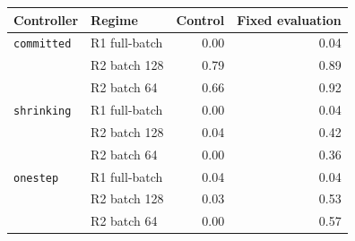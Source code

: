 \begin{tabular}{llrr}
\toprule
Controller & Regime & Control & Fixed evaluation \\
\midrule
\texttt{committed} & R1 full-batch & 0.00 & 0.04 \\
 & R2 batch 128 & 0.79 & 0.89 \\
 & R2 batch 64 & 0.66 & 0.92 \\
\midrule
\texttt{shrinking} & R1 full-batch & 0.00 & 0.04 \\
 & R2 batch 128 & 0.04 & 0.42 \\
 & R2 batch 64 & 0.00 & 0.36 \\
\midrule
\texttt{onestep} & R1 full-batch & 0.04 & 0.04 \\
 & R2 batch 128 & 0.03 & 0.53 \\
 & R2 batch 64 & 0.00 & 0.57 \\
\bottomrule
\end{tabular}
